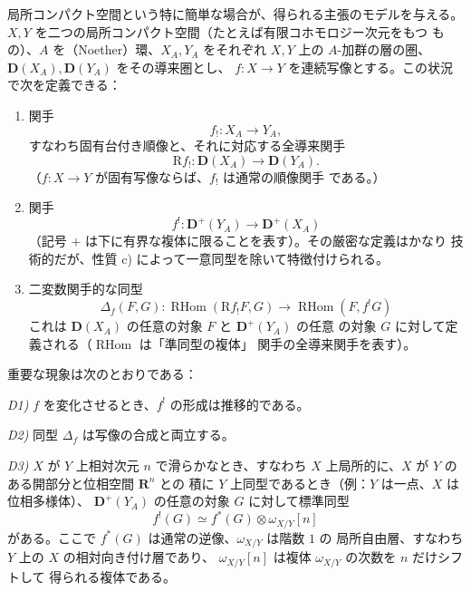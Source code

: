 \clearpage
{}
局所コンパクト空間という特に簡単な場合が、得られる主張のモデルを与える。
$X,Y$ を二つの局所コンパクト空間（たとえば有限コホモロジー次元をもつ
もの）、$A$ を（Noether）環、$X_A,Y_A$ をそれぞれ $X,Y$ 上の
$A$-加群の層の圏、$\mathbf D(X_A),\mathbf D(Y_A)$ をその導来圏とし、
$f\colon X\longrightarrow Y$ を連続写像とする。この状況で次を定義できる：

\begin{enumerate}
\renewcommand{\labelenumi}{\alph{enumi})}
\item 関手
\[
f_!\colon X_A\longrightarrow Y_A,
\]
すなわち固有台付き順像と、それに対応する全導来関手
\[
\mathrm Rf_!\colon \mathbf D(X_A)\longrightarrow \mathbf D(Y_A).
\]
（$f\colon X\longrightarrow Y$ が固有写像ならば、$f_!$ は通常の順像関手
である。）

\item 関手
\[
f^!\colon \mathbf D^+(Y_A)\longrightarrow \mathbf D^+(X_A)
\]
（記号 $+$ は下に有界な複体に限ることを表す）。その厳密な定義はかなり
技術的だが、性質 c) によって一意同型を除いて特徴付けられる。

\item 二変数関手的な同型
\[
\Delta_f(F,G)\colon
\operatorname{RHom}(\mathrm Rf_!F,G)
\longrightarrow
\operatorname{RHom}(F,f^!G)
\]
これは $\mathbf D(X_A)$ の任意の対象 $F$ と $\mathbf D^+(Y_A)$ の任意
の対象 $G$ に対して定義される（$\operatorname{RHom}$ は「準同型の複体」
関手の全導来関手を表す）。
\end{enumerate}

重要な現象は次のとおりである：

\noindent\textit{D1)} $f$ を変化させるとき、$f^!$ の形成は推移的である。

\noindent\textit{D2)} 同型 $\Delta_f$ は写像の合成と両立する。

\noindent\textit{D3)} $X$ が $Y$ 上相対次元 $n$ で滑らかなとき、すなわち
$X$ 上局所的に、$X$ が $Y$ のある開部分と位相空間 $\mathbf R^n$ との
積に $Y$ 上同型であるとき（例：$Y$ は一点、$X$ は位相多様体）、
$\mathbf D^+(Y_A)$ の任意の対象 $G$ に対して標準同型
\[
f^!(G)\simeq f^*(G)\otimes\omega_{X/Y}[n]
\]
がある。ここで $f^*(G)$ は通常の逆像、$\omega_{X/Y}$ は階数 $1$ の
局所自由層、すなわち $Y$ 上の $X$ の相対向き付け層であり、
$\omega_{X/Y}[n]$ は複体 $\omega_{X/Y}$ の次数を $n$ だけシフトして
得られる複体である。
